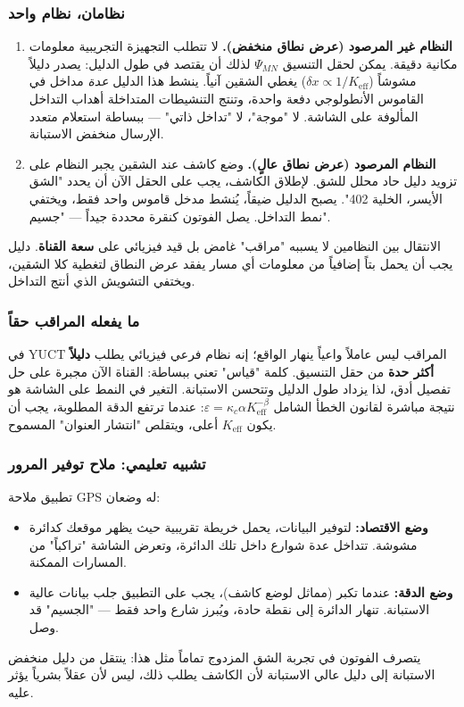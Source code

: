 \documentclass[12pt,a4paper]{article}
\theoremstyle{remark}
\begin{document}
	\subsubsection{نظامان، نظام واحد}
	
	\begin{enumerate}[leftmargin=*]
		\item \textbf{النظام غير المرصود (عرض نطاق منخفض).}
		لا تتطلب التجهيزة التجريبية معلومات مكانية دقيقة. يمكن لحقل التنسيق \(\Psi_{MN}\) لذلك أن يقتصد في طول الدليل: يصدر دليلاً مشوشاً (\(\delta x \propto 1/K_{\mathrm{eff}}\)) يغطي الشقين آنياً. ينشط هذا الدليل \emph{عدة} مداخل في القاموس الأنطولوجي دفعة واحدة، وتنتج التنشيطات المتداخلة أهداب التداخل المألوفة على الشاشة. لا "موجة"، لا "تداخل ذاتي" — ببساطة استعلام متعدد الإرسال منخفض الاستبانة.
		
		\item \textbf{النظام المرصود (عرض نطاق عالٍ).}
		وضع كاشف عند الشقين يجبر النظام على تزويد دليل حاد محلل للشق. لإطلاق الكاشف، يجب على الحقل الآن أن يحدد "الشق الأيسر، الخلية 402". يصبح الدليل ضيقاً، يُنشط مدخل قاموس واحد فقط، ويختفي نمط التداخل. يصل الفوتون كنقرة محددة جيداً — "جسيم".
	\end{enumerate}
	
	الانتقال بين النظامين لا يسببه "مراقب" غامض بل قيد فيزيائي على \textbf{سعة القناة}. دليل يجب أن يحمل بتاً إضافياً من معلومات أي مسار يفقد عرض النطاق لتغطية كلا الشقين، ويختفي التشويش الذي أنتج التداخل.
	
	\subsubsection{ما يفعله المراقب حقاً}
	
	في YUCT المراقب ليس عاملاً واعياً ينهار الواقع؛ إنه نظام فرعي فيزيائي يطلب \textbf{دليلاً أكثر حدة} من حقل التنسيق. كلمة "قياس" تعني ببساطة: القناة الآن مجبرة على حل تفصيل أدق، لذا يزداد طول الدليل وتتحسن الاستبانة. التغير في النمط على الشاشة هو نتيجة مباشرة لقانون الخطأ الشامل \(\varepsilon = \kappa_c \alpha K_{\mathrm{eff}}^{-\beta}\): عندما ترتفع الدقة المطلوبة، يجب أن يكون \(K_{\mathrm{eff}}\) أعلى، ويتقلص "انتشار العنوان" المسموح.
	
	\subsubsection{تشبيه تعليمي: ملاح توفير المرور}
	
	تطبيق ملاحة GPS له وضعان:
	\begin{itemize}
		\item \textbf{وضع الاقتصاد:} لتوفير البيانات، يحمل خريطة تقريبية حيث يظهر موقعك كدائرة مشوشة. تتداخل عدة شوارع داخل تلك الدائرة، وتعرض الشاشة "تراكباً" من المسارات الممكنة.
		\item \textbf{وضع الدقة:} عندما تكبر (مماثل لوضع كاشف)، يجب على التطبيق جلب بيانات عالية الاستبانة. تنهار الدائرة إلى نقطة حادة، ويُبرز شارع واحد فقط — "الجسيم" قد وصل.
	\end{itemize}
	يتصرف الفوتون في تجربة الشق المزدوج تماماً مثل هذا: ينتقل من دليل منخفض الاستبانة إلى دليل عالي الاستبانة لأن الكاشف يطلب ذلك، ليس لأن عقلاً بشرياً يؤثر عليه.
	
\end{document}
